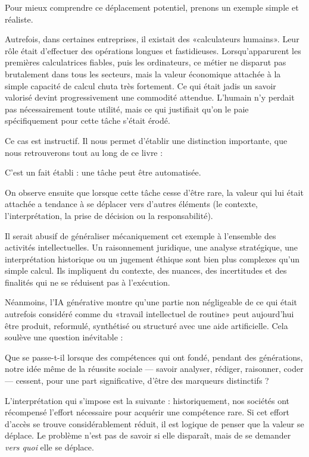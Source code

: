 Pour mieux comprendre ce déplacement potentiel, prenons un exemple simple et réaliste.

Autrefois, dans certaines entreprises, il existait des «calculateurs humains». Leur rôle était d'effectuer des opérations longues et fastidieuses. Lorsqu'apparurent les premières calculatrices fiables, puis les ordinateurs, ce métier ne disparut pas brutalement dans tous les secteurs, mais la valeur économique attachée à la simple capacité de calcul chuta très fortement. Ce qui était jadis un savoir valorisé devint progressivement une commodité attendue. L'humain n'y perdait pas nécessairement toute utilité, mais ce qui justifiait qu'on le paie spécifiquement pour cette tâche s'était érodé.

Ce cas est instructif. Il nous permet d'établir une distinction importante, que nous retrouverons tout au long de ce livre :

C'est un fait établi : une tâche peut être automatisée.

On observe ensuite que lorsque cette tâche cesse d'être rare, la valeur qui lui était attachée a tendance à se déplacer vers d'autres éléments (le contexte, l'interprétation, la prise de décision ou la responsabilité).

Il serait abusif de généraliser mécaniquement cet exemple à l'ensemble des activités intellectuelles. Un raisonnement juridique, une analyse stratégique, une interprétation historique ou un jugement éthique sont bien plus complexes qu'un simple calcul. Ils impliquent du contexte, des nuances, des incertitudes et des finalités qui ne se réduisent pas à l'exécution.

Néanmoins, l'IA générative montre qu'une partie non négligeable de ce qui était autrefois considéré comme du «travail intellectuel de routine» peut aujourd'hui être produit, reformulé, synthétisé ou structuré avec une aide artificielle. Cela soulève une question inévitable :

\begin{aiquote}
Que se passe-t-il lorsque des compétences qui ont fondé, pendant des générations, notre idée même de la réussite sociale — savoir analyser, rédiger, raisonner, coder — cessent, pour une part significative, d'être des marqueurs distinctifs ?
\end{aiquote}

L'interprétation qui s'impose est la suivante : historiquement, nos sociétés ont récompensé l'effort nécessaire pour acquérir une compétence rare. Si cet effort d'accès se trouve considérablement réduit, il est logique de penser que la valeur se déplace. Le problème n'est pas de savoir si elle disparaît, mais de se demander \emph{vers quoi} elle se déplace.

